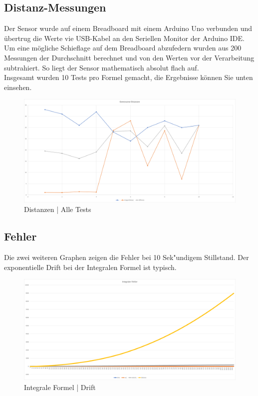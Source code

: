 \subsection{Distanz-Messungen}
Der Sensor wurde auf einem Breadboard mit einem Arduino Uno verbunden und übertrug die Werte
vie USB-Kabel an den Seriellen Monitor der Arduino IDE. Um eine mögliche Schieflage auf dem
Breadboard abzufedern wurden aus 200 Messungen der Durchschnitt berechnet und von den Werten vor
der Verarbeitung subtrahiert. So liegt der Sensor mathematisch absolut flach auf. \\
Insgesamt wurden 10 Tests pro Formel gemacht, die Ergebnisse können Sie unten einsehen.\\

\begin{figure} [h]
    \centering
    \includegraphics[width = 15cm]{Bilder/_DistanzVergleich}
    \caption{Distanzen | Alle Tests}
    \end{figure}

\subsection{Fehler}
Die zwei weiteren Graphen zeigen die Fehler bei 10 Sek"undigem Stillstand. Der exponentielle Drift 
bei der Integralen Formel ist typisch.

\begin{figure} [h]
    \centering
    \includegraphics[width = 15cm]{Bilder/_integralDistance001}
    \caption{Integrale Formel | Drift}
    \end{figure}

